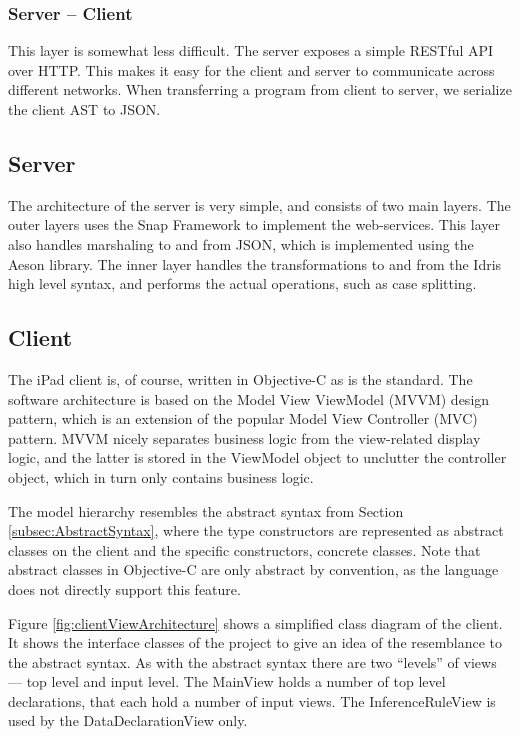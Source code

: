 \subsubsection{Server -- Client}
This layer is somewhat less difficult. The server exposes a simple RESTful API 
over HTTP\@. This makes it easy for the client and server to communicate across
different networks. When transferring a program from client to server, we
serialize the client AST to JSON\@.

\subsection{Server}
The architecture of the server is very simple, and consists of two main 
layers. The outer layers uses the Snap Framework to implement the 
web-services. This layer also handles marshaling to and from JSON\@, which is 
implemented using the Aeson library. The inner layer handles the 
transformations to and from the Idris high level syntax, and performs the 
actual operations, such as case splitting.


\subsection{Client}
The iPad client is, of course, written in Objective-C as is the standard. The
software architecture is based on the Model View ViewModel (MVVM) design 
pattern, which is an extension of the popular Model View Controller 
(MVC) pattern. MVVM nicely separates business logic from the view-related
display logic, and the latter is stored in the ViewModel object to unclutter 
the controller object, which in turn only contains business logic.

The model hierarchy resembles the abstract syntax from Section \ref{subsec:AbstractSyntax},
where the type constructors are represented as abstract classes on the client
and the specific constructors, concrete classes. Note that abstract classes in
Objective-C are only abstract by convention, as the language does not directly
support this feature.

Figure \ref{fig:clientViewArchitecture} shows a simplified class diagram of the
client. It shows the interface classes of the project to give an idea of
the resemblance to the abstract syntax. As with the abstract syntax there are
two ``levels'' of views --- top level and input level. The MainView holds a
number of top level declarations, that each hold a number of input views. The
InferenceRuleView is used by the DataDeclarationView only.

